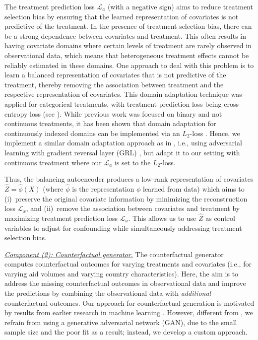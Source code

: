 \documentclass[sigconf]{acmart}
\begin{document}
The treatment prediction loss $\mathcal{L}_a$ (with a negative sign) aims to reduce treatment selection bias by ensuring that the learned representation of covariates is not predictive of the treatment. In the presence of treatment selection bias, there can be a strong dependence between covariates and treatment. This often results in having covariate domains where certain levels of treatment are rarely observed in observational data, which means that heterogeneous treatment effects cannot be reliably estimated in these domains. One approach to deal with this problem is to learn a balanced representation of covariates that is not predictive of the treatment, thereby removing the association between treatment and the respective representation of covariates. This domain adaptation technique was applied for categorical treatments, with treatment prediction loss being cross-entropy loss (see \cite{BicaCRN2020}). While previous work was focused on binary and not continuous treatments, it has been shown that domain adaptation for continuously indexed domains can be implemented via an $L_2$-loss \cite{WangDA2020}. Hence, we implement a similar domain adaptation approach as in \cite{BicaCRN2020}, i.e., using adversarial learning with gradient reversal layer (GRL) \cite{Ganin2016}, but adapt it to our setting with continuous treatment where our $\mathcal{L}_a$ is set to the $L_2$-loss. 

Thus, the balancing autoencoder produces a low-rank representation of covariates $\hat{Z} = \hat{\phi}(X)$ (where $\hat{\phi}$ is the representation $\phi$ learned from data) which aims to (i)~preserve the original covariate information by minimizing the reconstruction loss $\mathcal{L}_x$, and (ii)~remove the association between covariates and treatment by maximizing treatment prediction loss $\mathcal{L}_a$. This allows us to use $\hat{Z}$ as control variables to adjust for confounding while simultaneously addressing treatment selection bias. 

\noindent
\underline{\emph{Component (2): Counterfactual generator.}} The counterfactual generator computes counterfactual outcomes for varying treatments and covariates (i.e., for varying aid volumes and varying country characteristics). Here, the aim is to address the missing counterfactual outcomes in observational data and improve the predictions by combining the observational data with \emph{additional} counterfactual outcomes. Our approach for counterfactual generation is motivated by results from earlier research in machine learning \cite{Bica2020}. However, different from \cite{Bica2020}, we refrain from using a generative adversarial network (GAN), due to the small sample size and the poor fit as a result; instead, we develop a custom approach. 
\end{document}

